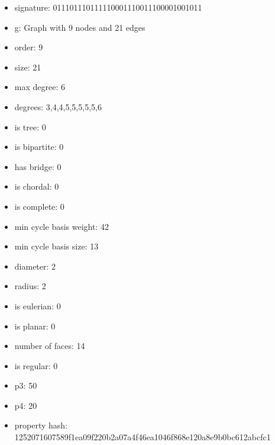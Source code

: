 \newpage
\begin{figure}
\end{figure}
\begin{itemize}
\item signature: 011101110111110001110011100001001011
\item g: Graph with 9 nodes and 21 edges
\item order: 9
\item size: 21
\item max degree: 6
\item degrees: 3,4,4,5,5,5,5,5,6
\item is tree: 0
\item is bipartite: 0
\item has bridge: 0
\item is chordal: 0
\item is complete: 0
\item min cycle basis weight: 42
\item min cycle basis size: 13
\item diameter: 2
\item radius: 2
\item is eulerian: 0
\item is planar: 0
\item number of faces: 14
\item is regular: 0
\item p3: 50
\item p4: 20
\item property hash: 1252071607589f1ea09f220b2a07a4f46ea1046f868e120a8e9b0bc612abcfc1
\end{itemize}

